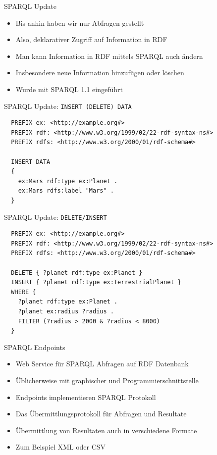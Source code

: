 \documentclass{beamer}
\begin{document}
\begin{frame}{SPARQL Update}
	
	\begin{itemize}
		\item Bis anhin haben wir nur Abfragen gestellt
		\item Also, deklarativer Zugriff auf Information in RDF
		\item Man kann Information in RDF mittels SPARQL auch ändern
		\item Insbesondere neue Information hinzufügen oder löschen
		\item Wurde mit SPARQL 1.1 eingeführt
	\end{itemize}
	
\end{frame}

\begin{frame}[fragile]{SPARQL Update: \texttt{INSERT (DELETE) DATA}}
	
	\small
	\begin{lstlisting}
  PREFIX ex: <http://example.org#> 
  PREFIX rdf: <http://www.w3.org/1999/02/22-rdf-syntax-ns#>
  PREFIX rdfs: <http://www.w3.org/2000/01/rdf-schema#>
	
  INSERT DATA
  {
	ex:Mars rdf:type ex:Planet .
	ex:Mars rdfs:label "Mars" .
  }
	\end{lstlisting}
	
\end{frame}

\begin{frame}[fragile]{SPARQL Update: \texttt{DELETE/INSERT}}
	
	\small
	\begin{lstlisting}
  PREFIX ex: <http://example.org#> 
  PREFIX rdf: <http://www.w3.org/1999/02/22-rdf-syntax-ns#>
  PREFIX rdfs: <http://www.w3.org/2000/01/rdf-schema#>
	
  DELETE { ?planet rdf:type ex:Planet }
  INSERT { ?planet rdf:type ex:TerrestrialPlanet } 
  WHERE {
    ?planet rdf:type ex:Planet .
    ?planet ex:radius ?radius .
    FILTER (?radius > 2000 & ?radius < 8000)
  }
	\end{lstlisting}
	
\end{frame}


\begin{frame}{SPARQL Endpoints}
	
	\begin{itemize}
		\item Web Service für SPARQL Abfragen auf RDF Datenbank
		\item Üblicherweise mit graphischer und Programmierschnittstelle
		\item Endpoints implementieren SPARQL Protokoll
		\item Das Übermittlungsprotokoll für Abfragen und Resultate
		\item Übermittlung von Resultaten auch in verschiedene Formate
		\item Zum Beispiel XML oder CSV
	\end{itemize}
	
\end{frame}
\end{document}

